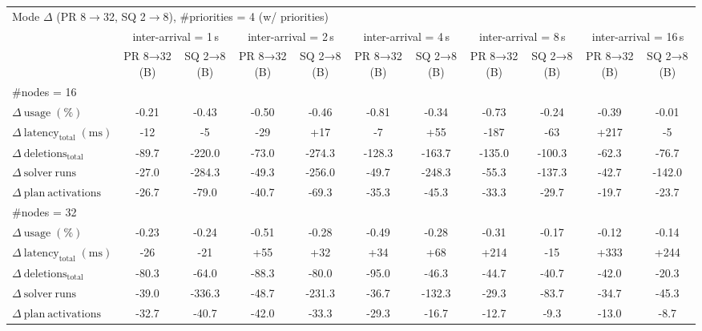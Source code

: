 
\begin{tabular}{l c c c c c c c c c c}
\toprule
\multicolumn{11}{l}{Mode $\Delta$ (PR 8$\rightarrow$32, SQ 2$\rightarrow$8), \#priorities = 4 (w/ priorities)} \\
\addlinespace[0.2em]
 & \multicolumn{2}{c}{inter-arrival = 1\,s} & \multicolumn{2}{c}{inter-arrival = 2\,s} & \multicolumn{2}{c}{inter-arrival = 4\,s} & \multicolumn{2}{c}{inter-arrival = 8\,s} & \multicolumn{2}{c}{inter-arrival = 16\,s} \\
\cmidrule(lr){2-3}\cmidrule(lr){4-5}\cmidrule(lr){6-7}\cmidrule(lr){8-9}\cmidrule(lr){10-11}
 & PR 8→32 (B) & SQ 2→8 (B) & PR 8→32 (B) & SQ 2→8 (B) & PR 8→32 (B) & SQ 2→8 (B) & PR 8→32 (B) & SQ 2→8 (B) & PR 8→32 (B) & SQ 2→8 (B) \\
\midrule
\multicolumn{11}{l}{\#nodes = 16} \\
\midrule
$\Delta\ \mathrm{usage}\;(\%)$ & -0.21 & -0.43 & -0.50 & -0.46 & -0.81 & -0.34 & -0.73 & -0.24 & -0.39 & -0.01 \\
$\Delta\ \mathrm{latency}_{\mathrm{total}}\;(\mathrm{ms})$ & -12 & -5 & -29 & +17 & -7 & +55 & -187 & -63 & +217 & -5 \\
$\Delta\ \mathrm{deletions}_{\mathrm{total}}$ & -89.7 & -220.0 & -73.0 & -274.3 & -128.3 & -163.7 & -135.0 & -100.3 & -62.3 & -76.7 \\
$\Delta\ \mathrm{solver\ runs}$ & -27.0 & -284.3 & -49.3 & -256.0 & -49.7 & -248.3 & -55.3 & -137.3 & -42.7 & -142.0 \\
$\Delta\ \mathrm{plan\ activations}$ & -26.7 & -79.0 & -40.7 & -69.3 & -35.3 & -45.3 & -33.3 & -29.7 & -19.7 & -23.7 \\
\midrule
\multicolumn{11}{l}{\#nodes = 32} \\
\midrule
$\Delta\ \mathrm{usage}\;(\%)$ & -0.23 & -0.24 & -0.51 & -0.28 & -0.49 & -0.28 & -0.31 & -0.17 & -0.12 & -0.14 \\
$\Delta\ \mathrm{latency}_{\mathrm{total}}\;(\mathrm{ms})$ & -26 & -21 & +55 & +32 & +34 & +68 & +214 & -15 & +333 & +244 \\
$\Delta\ \mathrm{deletions}_{\mathrm{total}}$ & -80.3 & -64.0 & -88.3 & -80.0 & -95.0 & -46.3 & -44.7 & -40.7 & -42.0 & -20.3 \\
$\Delta\ \mathrm{solver\ runs}$ & -39.0 & -336.3 & -48.7 & -231.3 & -36.7 & -132.3 & -29.3 & -83.7 & -34.7 & -45.3 \\
$\Delta\ \mathrm{plan\ activations}$ & -32.7 & -40.7 & -42.0 & -33.3 & -29.3 & -16.7 & -12.7 & -9.3 & -13.0 & -8.7 \\
\bottomrule
\end{tabular}


